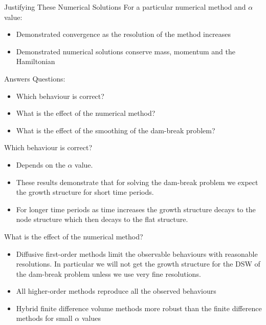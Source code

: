 \documentclass[pdf]{beamer}
\begin{document}
\begin{frame}{Justifying These Numerical Solutions}
	For a particular numerical method and $\alpha$ value:
	\begin{itemize}
		\item Demonstrated convergence as the resolution of the method increases
		\item Demonstrated numerical solutions conserve mass, momentum and the Hamiltonian
	\end{itemize}
\end{frame}

\begin{frame}{Answers}
	Questions:
	\begin{itemize}
		\item Which behaviour is correct?
		\item What is the effect of the numerical method?
		\item What is the effect of the smoothing of the dam-break problem?
	\end{itemize}
\end{frame}

\begin{frame}{Which behaviour is correct?}
	\begin{itemize}
		\item Depends on the $\alpha$ value.
		\item These results demonstrate that for solving the dam-break problem we expect the growth structure for short time periods.
		\item For longer time periods as time increases the growth structure decays to the node structure which then decays to the flat structure.
	\end{itemize}
\end{frame}

\begin{frame}{What is the effect of the numerical method?}
	\begin{itemize}
		\item Diffusive first-order methods limit the observable behaviours with reasonable resolutions. In particular we will not get the growth structure for the DSW of the dam-break problem unless we use very fine resolutions.
		\item All higher-order methods reproduce all the observed behaviours
		\item Hybrid finite difference volume methods more robust than the finite difference methods for small $\alpha$ values
	\end{itemize}
\end{frame}
\end{document}
